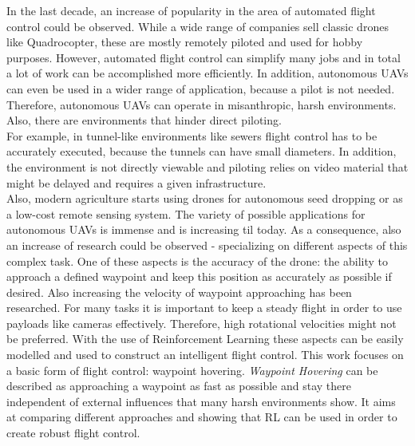 In the last decade, an increase of popularity in the area of automated flight
control could be observed. While a wide range of companies sell classic
drones like Quadrocopter, these are mostly remotely piloted and used for
hobby purposes.
However, automated flight control can simplify many jobs and in total a
lot of work can be accomplished more efficiently.
In addition, autonomous UAVs can even be used in a wider range of application,
because a pilot is not needed.
Therefore, autonomous UAVs can operate in misanthropic, harsh environments.
Also, there are environments that hinder direct piloting.\\
For example, in tunnel-like environments like sewers flight control has to be accurately
executed, because the tunnels can have small diameters. In addition,
the environment is not directly viewable and piloting relies on video material
that might be delayed and requires a given infrastructure. \\
Also, modern agriculture starts using drones for autonomous seed dropping or
as a low-cost remote sensing system. The variety of possible applications 
for autonomous UAVs is immense and is increasing til today.
As a consequence, also an increase of research could be observed - specializing 
on different aspects of this complex task.
One of these aspects is the accuracy of the drone: the ability to approach 
a defined waypoint and keep this position as accurately as possible if desired.
Also increasing the velocity of waypoint approaching has been researched.
For many tasks it is important to keep a steady flight in order to
use payloads like cameras effectively.
Therefore, high rotational velocities might not be preferred. 
With the use of Reinforcement Learning these aspects can be easily modelled
and used to construct an intelligent flight control.
This work focuses on a basic form of flight control: waypoint hovering.
\emph{Waypoint Hovering} can be described as approaching a waypoint as fast as 
possible and stay there independent of external influences that many harsh
environments show. It aims at comparing different approaches and showing
that RL can be used in order to create robust flight control.

